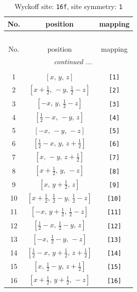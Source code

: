 \documentclass[fleqn,8pt]{jsarticle}
\begin{document}
\begin{longtable}{ccc}
\caption{Wyckoff site: {\tt 16f}, site symmetry: {\tt 1}}
 \\
 \hline \hline
No. & position & mapping \\ \hline \endfirsthead

\multicolumn{2}{l}{\tablename\ \thetable{}} \\
 \hline \hline
No. & position & mapping \\ \hline \endhead

 \hline \hline
\multicolumn{2}{r}{\footnotesize\it continued ...} \\ \endfoot

 \hline \hline
\multicolumn{2}{r}{} \\ \endlastfoot

1 & $\left[ x,\, y,\, z \right]$ & {\tt [1]} \\ \hline
2 & $\left[ x + \frac{1}{2},\, - y,\, \frac{1}{2} - z \right]$ & {\tt [2]} \\ \hline
3 & $\left[ - x,\, y,\, \frac{1}{2} - z \right]$ & {\tt [3]} \\ \hline
4 & $\left[ \frac{1}{2} - x,\, - y,\, z \right]$ & {\tt [4]} \\ \hline
5 & $\left[ - x,\, - y,\, - z \right]$ & {\tt [5]} \\ \hline
6 & $\left[ \frac{1}{2} - x,\, y,\, z + \frac{1}{2} \right]$ & {\tt [6]} \\ \hline
7 & $\left[ x,\, - y,\, z + \frac{1}{2} \right]$ & {\tt [7]} \\ \hline
8 & $\left[ x + \frac{1}{2},\, y,\, - z \right]$ & {\tt [8]} \\ \hline
9 & $\left[ x,\, y + \frac{1}{2},\, z \right]$ & {\tt [9]} \\ \hline
10 & $\left[ x + \frac{1}{2},\, \frac{1}{2} - y,\, \frac{1}{2} - z \right]$ & {\tt [10]} \\ \hline
11 & $\left[ - x,\, y + \frac{1}{2},\, \frac{1}{2} - z \right]$ & {\tt [11]} \\ \hline
12 & $\left[ \frac{1}{2} - x,\, \frac{1}{2} - y,\, z \right]$ & {\tt [12]} \\ \hline
13 & $\left[ - x,\, \frac{1}{2} - y,\, - z \right]$ & {\tt [13]} \\ \hline
14 & $\left[ \frac{1}{2} - x,\, y + \frac{1}{2},\, z + \frac{1}{2} \right]$ & {\tt [14]} \\ \hline
15 & $\left[ x,\, \frac{1}{2} - y,\, z + \frac{1}{2} \right]$ & {\tt [15]} \\ \hline
16 & $\left[ x + \frac{1}{2},\, y + \frac{1}{2},\, - z \right]$ & {\tt [16]} \\
\end{longtable}
\end{document}
